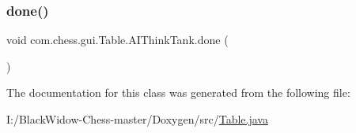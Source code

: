 \subsubsection{\texorpdfstring{done()}{done()}}
{\footnotesize\ttfamily void com.\+chess.\+gui.\+Table.\+A\+I\+Think\+Tank.\+done (\begin{DoxyParamCaption}{ }\end{DoxyParamCaption})}



The documentation for this class was generated from the following file\+:\begin{DoxyCompactItemize}
\item 
I\+:/\+Black\+Widow-\/\+Chess-\/master/\+Doxygen/src/\mbox{\hyperlink{_table_8java}{Table.\+java}}\end{DoxyCompactItemize}
